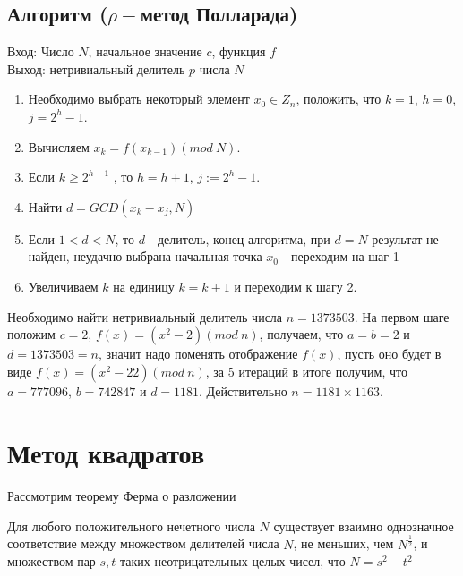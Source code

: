   \subsection{Алгоритм ($\rho-$метод Полларада)}
  
  Вход: Число $N$, начальное значение $c$, функция $f$  \\
  Выход: нетривиальный делитель $p$ числа $N$
  
    \begin{enumerate}
     \item Необходимо выбрать некоторый элемент $x_0 \in Z_n$, положить, что $k = 1$, $h = 0$, $j=2^h-1$.
     \item Вычисляем $x_k = f(x_{k-1})(mod \: N)$.
     \item Если $k \ge 2^{h+1}$ , то $h = h + 1$, $j := 2^h - 1$.
     \item Найти $d = GCD(x_k - x_j, N)$
     \item Если $1 < d < N$, то $d$ - делитель, конец алгоритма, при $d = N$ результат не найден, неудачно выбрана начальная точка $x_0$ - переходим на шаг 1
     \item Увеличиваем $k$ на единицу $k = k + 1$ и переходим к шагу 2.
    \end{enumerate}
  
  \begin{example}
    Необходимо найти нетривиальный делитель числа $n = 1373503$. На первом шаге положим $c = 2$, $f(x) = (x^{2} - 2)(mod \: n)$, 
    получаем, что $a = b = 2$ и $d = 1373503 = n$, значит надо поменять отображение $f(x)$, пусть оно будет в виде 
    $f(x) = (x^{2} - 22)(mod \: n)$, за 5 итераций в итоге получим, что $a = 777096$, $b = 742847$ и $d = 1181$. 
    Действительно $n = 1181 \times 1163$.
  \end{example}  

\section{Метод квадратов}

\paragraph{} Рассмотрим теорему Ферма о разложении

  \begin{theorem}
    Для любого положительного нечетного числа $N$ существует взаимно однозначное соответствие между множеством делителей числа $N$, 
    не меньших, чем $N^{ \frac{1}{2}}$, и множеством пар ${s, t}$ таких неотрицательных целых чисел, что 
    $N = s^{ 2} - t^{ 2}$
  \end{theorem}

